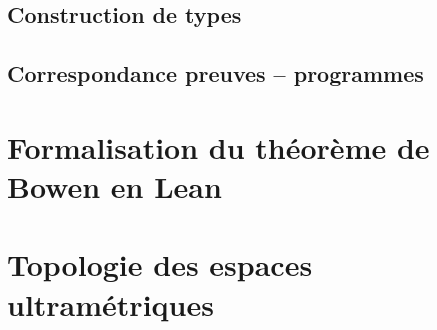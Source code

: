 \documentclass[a4paper, 11pt, twoside]{article}
\begin{document}
    \subsection{Construction de types}
      

    \subsection{Correspondance preuves -- programmes}
      

  \newpage
  \section{Formalisation du théorème de Bowen en Lean}
    

  \newpage
  \section{Topologie des espaces ultramétriques}
    

  \newpage
  \nocite{*}
  \thispagestyle{plain}
  \printbibliography[heading=bibintoc, title={Bibliographie}]

\end{document}
